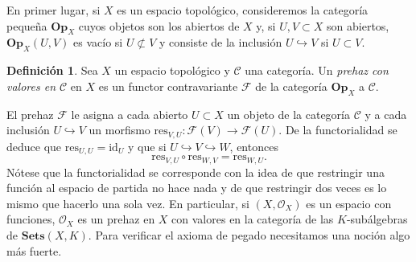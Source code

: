 \documentclass[12pt,a4paper]{article}
\theoremstyle{definition} \newtheorem{defn}[thm]{Definición}
\theoremstyle{definition} \newtheorem{ejemplo}[thm]{Ejemplo}
\theoremstyle{definition} \newtheorem{ejercicio}[thm]{Ejercicio}
\theoremstyle{remark} \newtheorem*{obs}{Observación}
\def\CC{\mathscr{C}}
\def\FF{\mathscr{F}}
\def\res{\mathrm{res}}
\def\OO{\mathscr{O}}
\begin{document}
	En primer lugar, si $X$ es un espacio topológico, consideremos la categoría pequeña $\mathbf{Op}_X$ cuyos objetos son los abiertos de $X$ y, si $U, V \subset X$ son abiertos, $\mathbf{Op}_X(U,V)$ es vacío si $U\not\subset V$ y consiste de la inclusión $U\hookrightarrow V$ si $U\subset V$.
	\begin{defn}
	  Sea $X$ un espacio topológico y $\CC$ una categoría. Un \emph{prehaz con valores en $\CC$} en $X$ es un functor contravariante $\FF$ de la categoría $\mathbf{Op}_X$ a $\CC$. 
	\end{defn}
	El prehaz $\FF$ le asigna a cada abierto $U\subset X$ un objeto de la categoría $\CC$ y a cada inclusión $U\hookrightarrow V$ un morfismo $\res_{V,U}:\FF(V)\rightarrow \FF(U)$. De la functorialidad se deduce que $\res_{U,U}=\mathrm{id}_U$ y que si $U\hookrightarrow V \hookrightarrow W$, entonces 
	\begin{equation*}
	  \res_{V,U}\circ \res_{W,V}=\res_{W,U}.
	\end{equation*}
	Nótese que la functorialidad se corresponde con la idea de que restringir una función al espacio de partida no hace nada y de que restringir dos veces es lo mismo que hacerlo una sola vez. En particular, si $(X,\OO_X)$ es un espacio con funciones, $\OO_X$ es un prehaz en $X$ con valores en la categoría de las $K$-subálgebras de $\mathbf{Sets}(X,K)$. Para verificar el axioma de pegado necesitamos una noción algo más fuerte.
\end{document}
